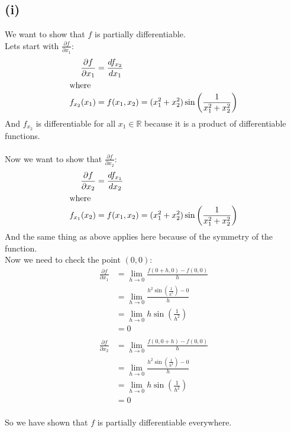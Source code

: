 \documentclass{article}
\begin{document}
\subsection*{(i)}
We want to show that \(f\) is partially differentiable. \\
Lets start with \(\frac{\partial f}{\partial x_1}\):
\begin{align*}
   \frac{\partial f}{\partial x_1} &= \frac{df_{x_2}}{dx_1} \\
   \intertext{where}
   f_{x_2}(x_1) &= f(x_1, x_2) = (x_1^2 + x_2^2) \sin\left(\frac{1}{x_1^2 + x_2^2}\right)
\end{align*}
And \(f_{x_2}\) is differentiable for all \(x_1 \in \mathbb{R}\) because it is a product of differentiable functions. \\
\\
Now we want to show that \(\frac{\partial f}{\partial x_2}\):
\begin{align*}
   \frac{\partial f}{\partial x_2} &= \frac{df_{x_1}}{dx_2} \\
   \intertext{where}
   f_{x_1}(x_2) &= f(x_1, x_2) = (x_1^2 + x_2^2) \sin\left(\frac{1}{x_1^2 + x_2^2}\right)
\end{align*}
And the same thing as above applies here because of the symmetry of the function. \\
Now we need to check the point \((0,0)\):
\begin{align*}
   \frac{\partial f}{\partial x_1} &= \lim_{h \to 0} \frac{f(0 + h, 0) - f(0, 0)}{h} \\
   &= \lim_{h \to 0} \frac{h^2 \sin\left(\frac{1}{h^2}\right) - 0}{h} \\
   &= \lim_{h \to 0} h \sin\left(\frac{1}{h^2}\right) \\
   &= 0 \\
\end{align*}
\begin{align*}
   \frac{\partial f}{\partial x_2} &= \lim_{h \to 0} \frac{f(0, 0 + h) - f(0, 0)}{h} \\
   &= \lim_{h \to 0} \frac{h^2 \sin\left(\frac{1}{h^2}\right) - 0}{h} \\
   &= \lim_{h \to 0} h \sin\left(\frac{1}{h^2}\right) \\
   &= 0 \\
\end{align*}

So we have shown that \(f\) is partially differentiable everywhere.
\end{document}
